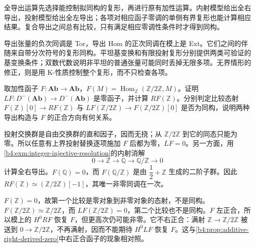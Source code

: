 




\begin{chaptersummary}
	全导出运算先选择能控制拟同构的复形，再进行原有加性运算。内射模型给出全右导出，投射模型给出全左导出；各项对相应函子零调的单侧有界复形也能计算相应结果。复合导出之间总有比较，只有满足相应零调性条件时才得到同构。

	\ProseParagraphBreak
	导出张量的负次同调是 Tor，导出 Hom 的正次同调在模上是 Ext。它们之间的伴随来自带分次符号的复形同构。平坦基变换和有限投射复形分别提供两类可验证的基变换条件；双数代数说明非平坦的普通张量可能同时丢掉无限多项。无界情形的修正，则是用 K-性质控制整个复形，而不只检查各项。
\end{chaptersummary}

\BookExercises

\begin{exercise}\label{b4:ex:18-additive-right-derived}
	取加性函子 \(F:\mathbf{Ab}\to\mathbf{Ab}\)，\(F(M)=\operatorname{Hom}_{\mathbb Z}(\mathbb Z/2\mathbb Z,M)\)。证明 \(LF:D^-(\mathbf{Ab})\to D^-(\mathbf{Ab})\) 是零函子，并计算 \(RF(\mathbb Z)\)。分别判定比较态射 \(F(\mathbb Z)[0]\to RF(\mathbb Z)\) 与 \(LF(\mathbb Z/2\mathbb Z)\to F(\mathbb Z/2\mathbb Z)[0]\) 是否为同构，说明两种导出构造与 \(F\) 的正合方向有何关系。
\end{exercise}
\begin{solution}
	投射交换群是自由交换群的直和因子，因而无挠；从 \(\mathbb Z/2\mathbb Z\) 到它的同态只能为零。所以任意有上界投射替换逐项施加 \(F\) 后都为零，\(LF=0\)。另一方面，用\cref{b4:exm:integer-injective-resolution}的内射消解
	\[
		0\longrightarrow\mathbb Z\longrightarrow\mathbb Q\longrightarrow\mathbb Q/\mathbb Z\longrightarrow0
	\]
	计算全右导出。\(F(\mathbb Q)=0\)，而 \(F(\mathbb Q/\mathbb Z)\) 是由 \(\dfrac{1}{2}+\mathbb Z\) 生成的二阶子群。因此 \(RF(\mathbb Z)\simeq(\mathbb Z/2\mathbb Z)[-1]\)，其唯一非零同调在一次。

	\(F(\mathbb Z)=0\)，故第一个比较是零对象到非零对象的态射，不是同构。\(F(\mathbb Z/2\mathbb Z)\simeq\mathbb Z/2\mathbb Z\)，而 \(LF(\mathbb Z/2\mathbb Z)=0\)，第二个比较也不是同构。\(F\) 左正合，所以模上的 \(H^0RF\) 恢复 \(F\)，但更高次仍可能非零。它不右正合：满射 \(\mathbb Z\to\mathbb Z/2\mathbb Z\) 被送到 \(0\to\mathbb Z/2\mathbb Z\)，不再满射，因而不能期待 \(H^0LF\) 恢复 \(F\)。这与\cref{b4:prop:additive-right-derived-zero}中右正合函子的现象相对照。
\end{solution}

